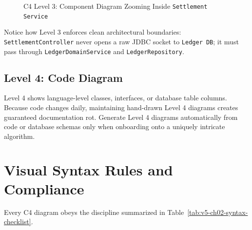 \begin{figure}[htbp]
\caption{C4 Level 3: Component Diagram Zooming Inside \texttt{Settlement Service}}
\label{fig:v5-ch02-l3-component}
\end{figure}

Notice how Level 3 enforces clean architectural boundaries: \texttt{SettlementController} never opens a raw JDBC socket to \texttt{Ledger DB}; it must pass through \texttt{LedgerDomainService} and \texttt{LedgerRepository}.

\subsection{Level 4: Code Diagram}

Level 4 shows language-level classes, interfaces, or database table columns. Because code changes daily, maintaining hand-drawn Level 4 diagrams creates guaranteed documentation rot. Generate Level 4 diagrams automatically from code or database schemas only when onboarding onto a uniquely intricate algorithm.

\section{Visual Syntax Rules and Compliance}

Every C4 diagram obeys the discipline summarized in Table~\ref{tab:v5-ch02-syntax-checklist}.

